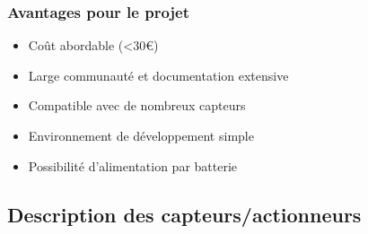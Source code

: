 \documentclass[12pt,a4paper]{article}
\begin{document}
\subsubsection{Avantages pour le projet}
\begin{itemize}
\item Coût abordable (<30€)
\item Large communauté et documentation extensive
\item Compatible avec de nombreux capteurs
\item Environnement de développement simple
\item Possibilité d'alimentation par batterie
\end{itemize}

\subsection{Description des capteurs/actionneurs}
\end{document}
